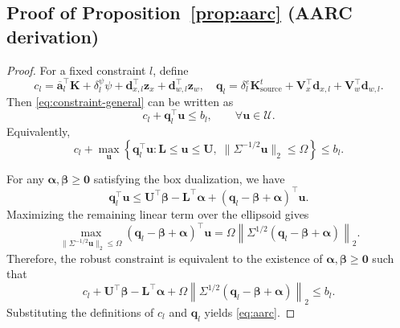 \documentclass[11pt, letter]{article}
\begin{document}
\subsection{Proof of Proposition~\ref{prop:aarc} (AARC derivation)}\label{app:proof-aarc}
\begin{proof}
For a fixed constraint $l$, define
\[
c_l
=
\overline{\boldsymbol a}_l^\top \boldsymbol K
+
\delta_l^\psi \psi
+
\boldsymbol d_{x,l}^\top \boldsymbol z_x
+
\boldsymbol d_{w,l}^\top \boldsymbol z_w
, \quad
\boldsymbol q_l
=
\delta_l^e \boldsymbol K_{\mathrm{source}}^t
+
\boldsymbol V_x^\top\boldsymbol d_{x,l}
+
\boldsymbol V_w^\top\boldsymbol d_{w,l}.
\]
Then \eqref{eq:constraint-general} can be written as
\[
c_l+\boldsymbol q_l^\top\boldsymbol u\le b_l,
\qquad
\forall \boldsymbol u\in\mathcal U.
\]
Equivalently,
\[
c_l+
\max_{\boldsymbol u}
\left\{
\boldsymbol q_l^\top\boldsymbol u:
\boldsymbol L\le \boldsymbol u\le \boldsymbol U,\;
\|\Sigma^{-1/2}\boldsymbol u\|_2\le \Omega
\right\}
\le b_l.
\]

For any $\boldsymbol\alpha,\boldsymbol\beta\ge\boldsymbol 0$ satisfying the
box dualization, we have
\[
\boldsymbol q_l^\top\boldsymbol u
\le
\boldsymbol U^\top\boldsymbol\beta
-
\boldsymbol L^\top\boldsymbol\alpha
+
(\boldsymbol q_l-\boldsymbol\beta+\boldsymbol\alpha)^\top\boldsymbol u.
\]
Maximizing the remaining linear term over the ellipsoid gives
\[
\max_{\|\Sigma^{-1/2}\boldsymbol u\|_2\le \Omega}
(\boldsymbol q_l-\boldsymbol\beta+\boldsymbol\alpha)^\top\boldsymbol u
=
\Omega
\left\|
\Sigma^{1/2}
(\boldsymbol q_l-\boldsymbol\beta+\boldsymbol\alpha)
\right\|_2.
\]
Therefore, the robust constraint is equivalent to the existence of
$\boldsymbol\alpha,\boldsymbol\beta\ge\boldsymbol 0$ such that
\[
c_l
+
\boldsymbol U^\top\boldsymbol\beta
-
\boldsymbol L^\top\boldsymbol\alpha
+
\Omega
\left\|
\Sigma^{1/2}
(\boldsymbol q_l-\boldsymbol\beta+\boldsymbol\alpha)
\right\|_2
\le b_l.
\]
Substituting the definitions of $c_l$ and $\boldsymbol q_l$ yields
\eqref{eq:aarc}.
\end{proof}
\end{document}
